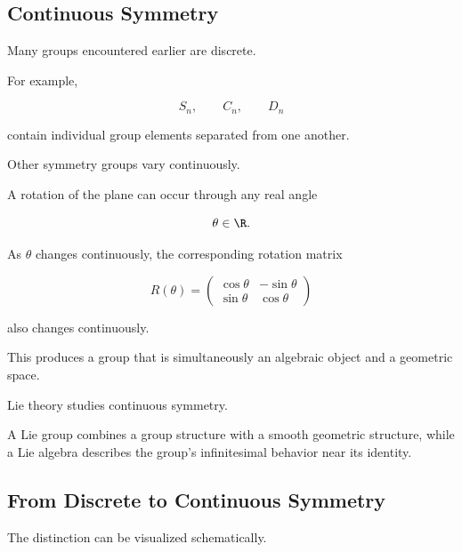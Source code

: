 \subsection{Continuous Symmetry}
\label{subsec:continuous-symmetry}

Many groups encountered earlier are discrete.

For example,

\[ S_n,\qquad C_n,\qquad D_n \]

contain individual group elements separated from one another.

Other symmetry groups vary continuously.

A rotation of the plane can occur through any real angle

\[ \theta\in\R. \]

As \(\theta\) changes continuously, the corresponding rotation matrix

\[ R(\theta)=
\begin{pmatrix}
\cos\theta&-\sin\theta\\
\sin\theta&\cos\theta
\end{pmatrix} \]

also changes continuously.

This produces a group that is simultaneously an algebraic object and a
geometric space.

\begin{conceptbox}
Lie theory studies continuous symmetry.

A Lie group combines a group structure with a smooth geometric structure,
while a Lie algebra describes the group's infinitesimal behavior near its
identity.
\end{conceptbox}

\subsection{From Discrete to Continuous Symmetry}
\label{subsec:discrete-continuous-symmetry}

The distinction can be visualized schematically.

\begin{center}
\end{center}

